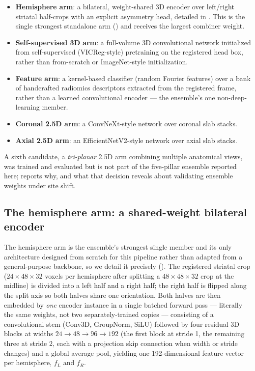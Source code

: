 \documentclass[10pt]{article}
\begin{document}
\begin{itemize}[leftmargin=*]
\item \textbf{Hemisphere arm}: a bilateral, weight-shared 3D encoder over left/right striatal half-crops with an explicit asymmetry head, detailed in . This is the single strongest standalone arm () and receives the largest combiner weight.
\item \textbf{Self-supervised 3D arm}: a full-volume 3D convolutional network initialized from self-supervised (VICReg-style) pretraining on the registered head box, rather than from-scratch or ImageNet-style initialization.
\item \textbf{Feature arm}: a kernel-based classifier (random Fourier features) over a bank of handcrafted radiomics descriptors extracted from the registered frame, rather than a learned convolutional encoder --- the ensemble's one non-deep-learning member.
\item \textbf{Coronal 2.5D arm}: a ConvNeXt-style network over coronal slab stacks.
\item \textbf{Axial 2.5D arm}: an EfficientNetV2-style network over axial slab stacks.
\end{itemize}

A sixth candidate, a \emph{tri-planar} 2.5D arm combining multiple anatomical views, was trained and evaluated but is not part of the five-pillar ensemble reported here;  reports why, and what that decision reveals about validating ensemble weights under site shift.

\subsection{The hemisphere arm: a shared-weight bilateral encoder}
\label{sec:hemi}

The hemisphere arm is the ensemble's strongest single member and its only architecture designed from scratch for this pipeline rather than adapted from a general-purpose backbone, so we detail it precisely (). The registered striatal crop ($24\times48\times32$ voxels per hemisphere after splitting a $48\times48\times32$ crop at the midline) is divided into a left half and a right half; the right half is flipped along the split axis so both halves share one orientation. Both halves are then embedded by \emph{one} encoder instance in a single batched forward pass --- literally the same weights, not two separately-trained copies --- consisting of a convolutional stem (Conv3D, GroupNorm, SiLU) followed by four residual 3D blocks at widths $24{\to}48{\to}96{\to}192$ (the first block at stride 1, the remaining three at stride 2, each with a projection skip connection when width or stride changes) and a global average pool, yielding one 192-dimensional feature vector per hemisphere, $f_L$ and $f_R$.
\end{document}
